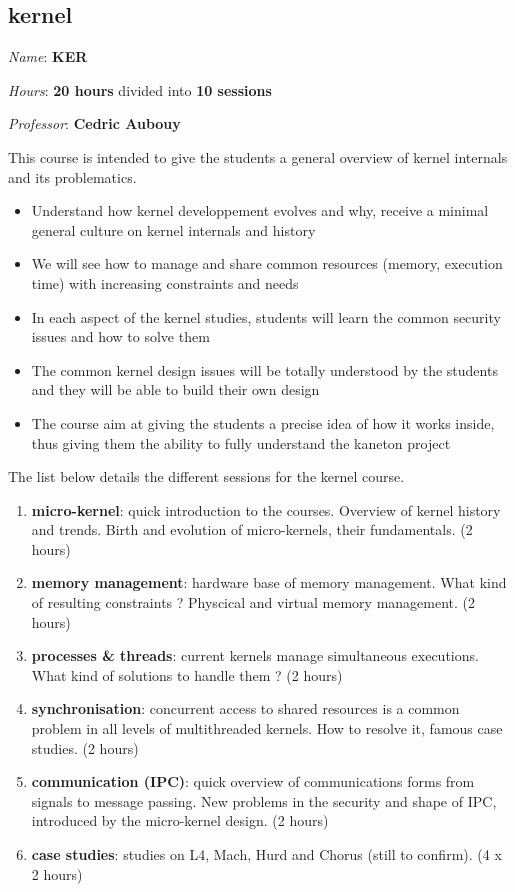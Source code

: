 \begin{multicols}{2}
\section{kernel}

\textit{Name}: \textbf{KER}

\textit{Hours}: \textbf{20 hours} divided into \textbf{10 sessions}

\textit{Professor}: \textbf{Cedric Aubouy}

This course is intended to give the students a general overview of
kernel internals and its problematics.

\begin{itemize}
  \item
    Understand how kernel developpement evolves and why, receive a
    minimal general culture on kernel internals and history
  \item
    We will see how to manage and share common resources (memory,
    execution time) with increasing constraints and needs
  \item
    In each aspect of the kernel studies, students will learn the
    common security issues and how to solve them
  \item
    The common kernel design issues will be totally understood by the
    students and they will be able to build their own design
  \item
    The course aim at giving the students a precise idea of how it
    works inside, thus giving them the ability to fully understand
    the kaneton project
\end{itemize}

The list below details the different sessions for the kernel course.\\

\begin{enumerate}
  \item
    \textbf{micro-kernel}: quick introduction to the courses. Overview
    of kernel history and trends. Birth and evolution of micro-kernels, their
    fundamentals. (2 hours)
  \item
    \textbf{memory management}: hardware base of memory management. What
    kind of resulting constraints ? Physcical and virtual memory
    management. (2 hours)
  \item
    \textbf{processes \& threads}: current kernels manage simultaneous
    executions. What kind of solutions to handle them ? (2 hours)
  \item
    \textbf{synchronisation}: concurrent access to shared resources is a
    common problem in all levels of multithreaded kernels. How to resolve it,
    famous case studies. (2 hours)
  \item
    \textbf{communication (IPC)}: quick overview of communications forms
    from signals to message passing. New problems in the security and shape of
    IPC, introduced by the micro-kernel design. (2 hours)
  \item
    \textbf{case studies}: studies on L4, Mach, Hurd and Chorus (still
    to confirm). (4 x 2 hours)
\end{enumerate}





\end{multicols}
